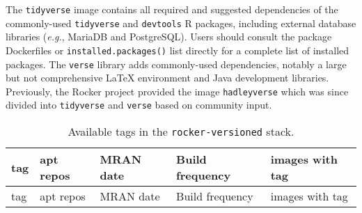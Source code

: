 The \texttt{tidyverse} image contains all required and suggested
dependencies of the commonly-used \texttt{tidyverse} and
\texttt{devtools} R packages, including external database libraries
(\emph{e.g.}, MariaDB and PostgreSQL). Users should consult the package
Dockerfiles or \texttt{installed.packages()} list directly for a
complete list of installed packages. The \texttt{verse} library adds
commonly-used dependencies, notably a large but not comprehensive LaTeX
environment and Java development libraries. Previously, the Rocker
project provided the image \texttt{hadleyverse} which was since divided
into \texttt{tidyverse} and \texttt{verse} based on community input.

\begin{longtable}[]{@{}lllll@{}}
\caption{Available tags in the \texttt{rocker-versioned}
stack.}\tabularnewline
\toprule
\begin{minipage}[b]{0.09\columnwidth}\raggedright\strut
tag\strut
\end{minipage} & \begin{minipage}[b]{0.12\columnwidth}\raggedright\strut
apt repos\strut
\end{minipage} & \begin{minipage}[b]{0.15\columnwidth}\raggedright\strut
MRAN date\strut
\end{minipage} & \begin{minipage}[b]{0.19\columnwidth}\raggedright\strut
Build frequency\strut
\end{minipage} & \begin{minipage}[b]{0.32\columnwidth}\raggedright\strut
images with tag\strut
\end{minipage}\tabularnewline
\midrule
\endfirsthead
\toprule
\begin{minipage}[b]{0.09\columnwidth}\raggedright\strut
tag\strut
\end{minipage} & \begin{minipage}[b]{0.12\columnwidth}\raggedright\strut
apt repos\strut
\end{minipage} & \begin{minipage}[b]{0.15\columnwidth}\raggedright\strut
MRAN date\strut
\end{minipage} & \begin{minipage}[b]{0.19\columnwidth}\raggedright\strut
Build frequency\strut
\end{minipage} & \begin{minipage}[b]{0.32\columnwidth}\raggedright\strut
images with tag\strut
\end{minipage}\tabularnewline

\end{longtable}
